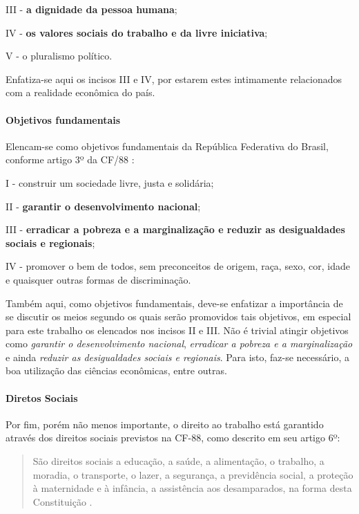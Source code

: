 \documentclass[]{article}
\let\oldparagraph\paragraph
\renewcommand{\paragraph}[1]{\oldparagraph{#1}\mbox{}}
\begin{document}
III - \textbf{a dignidade da pessoa humana};

IV - \textbf{os valores sociais do trabalho e da livre iniciativa};

V - o pluralismo político.

Enfatiza-se aqui os incisos III e IV, por estarem estes intimamente
relacionados com a realidade econômica do país.

\paragraph{Objetivos fundamentais}\label{objetivos-fundamentais}

Elencam-se como objetivos fundamentais da República Federativa do
Brasil, conforme artigo 3º da CF/88 \cite[grifo nosso]{cf88}:

I - construir um sociedade livre, justa e solidária;

II - \textbf{garantir o desenvolvimento nacional};

III - \textbf{erradicar a pobreza e a marginalização e reduzir as
desigualdades sociais e regionais};

IV - promover o bem de todos, sem preconceitos de origem, raça, sexo,
cor, idade e quaisquer outras formas de discriminação.

Também aqui, como objetivos fundamentais, deve-se enfatizar a
importância de se discutir os meios segundo os quais serão promovidos
tais objetivos, em especial para este trabalho os elencados nos incisos
II e III. Não é trivial atingir objetivos como \emph{garantir o
desenvolvimento nacional}, \emph{erradicar a pobreza e a marginalização}
e ainda \emph{reduzir as desigualdades sociais e regionais}. Para isto,
faz-se necessário, a boa utilização das ciências econômicas, entre
outras.

\paragraph{Diretos Sociais}\label{diretos-sociais}

Por fim, porém não menos importante, o direito ao trabalho está
garantido através dos direitos sociais previstos na CF-88, como descrito
em seu artigo 6º:

\begin{quote}
São direitos sociais a educação, a saúde, a alimentação, o trabalho, a
moradia, o transporte, o lazer, a segurança, a previdência social, a
proteção à maternidade e à infância, a assistência aos desamparados, na
forma desta Constituição \cite[art.~6º]{cf88}.
\end{quote}
\end{document}

